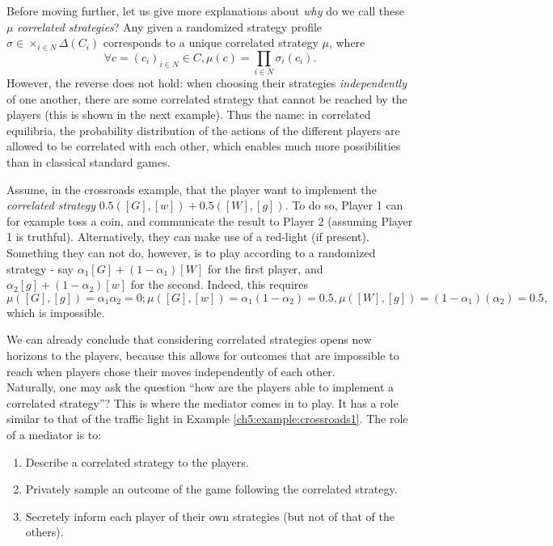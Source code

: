 Before moving further, let us give more explanations about \emph{why} do we call these $\mu$ \emph{correlated strategies}?
Any given a randomized strategy profile $\sigma \in \times_{i \in N} \Delta(C_i)$ corresponds to a unique correlated strategy $\mu$, where
$$\forall c = (c_i)_{i \in N} \in C, \mu(c) = \prod_{i \in N} \sigma_i(c_i). $$
However, the reverse does not hold: when choosing their strategies \emph{independently} of one another,  there are some correlated strategy that cannot be reached by the players (this is shown in the next example). Thus the name: in correlated equilibria, the probability distribution of the actions of the different players are allowed to be correlated with each other, which enables much more possibilities than in classical standard games.

\begin{example}
Assume, in the crossroads example, that the player want to implement the \emph{correlated strategy} $0.5([G], [w]) + 0.5 ([W], [g])$. To do so, Player 1 can for example toss a coin, and communicate the result to Player 2 (assuming Player 1 is truthful).  Alternatively, they can make use of a red-light (if present).\\
Something they can not do, however, is to play according to a randomized strategy - say $\alpha_1[G] + (1-\alpha_1)[W]$ for the first player, and $\alpha_2[g] + (1-\alpha_2)[w]$ for the second.
Indeed, this requires
$$ \mu([G], [g]) = \alpha_1 \alpha_2 = 0; \mu([G], [w]) = \alpha_1 (1-\alpha_2) = 0.5, \mu([W], [g]) = (1-\alpha_1) (\alpha_2) = 0.5, $$
which is impossible.
\end{example}
We can already conclude that considering correlated strategies opens new horizons to the players, because this allows for outcomes that are impossible to reach when players chose their moves independently of each other.\\

Naturally, one may ask the question ``how are the players able to implement a correlated strategy''?
This is where the mediator comes in to play. It has a role similar to that of the traffic light in Example \ref{ch5:example:crossroads1}.
The role of a mediator is to:
\begin{enumerate}
\item{Describe a correlated strategy to the players. }
\item{Privately sample an outcome of the game following the correlated strategy. }
\item{Secretely inform each player of their own strategies (but not of that of the others).}
\end{enumerate}








